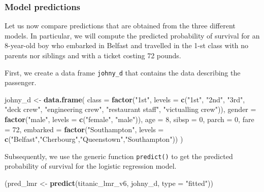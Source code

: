 \documentclass[12pt,]{krantz}
\newenvironment{Shaded}{\begin{snugshade}}{\end{snugshade}}
\newcommand{\DataTypeTok}[1]{\textcolor[rgb]{0.13,0.29,0.53}{#1}}
\newcommand{\DecValTok}[1]{\textcolor[rgb]{0.00,0.00,0.81}{#1}}
\newcommand{\KeywordTok}[1]{\textcolor[rgb]{0.13,0.29,0.53}{\textbf{#1}}}
\newcommand{\NormalTok}[1]{#1}
\newcommand{\StringTok}[1]{\textcolor[rgb]{0.31,0.60,0.02}{#1}}
\begin{document}
\hypertarget{predictions-titanic}{%
\subsubsection{Model predictions}\label{predictions-titanic}}

Let us now compare predictions that are obtained from the three different models. In particular, we will compute the predicted probability of survival for an 8-year-old boy who embarked in Belfast and travelled in the 1-st class with no parents nor siblings and with a ticket costing 72 pounds.

First, we create a data frame \texttt{johny\_d} that contains the data describing the passenger.

\begin{Shaded}
\begin{Highlighting}[]
\NormalTok{johny_d <-}\StringTok{ }\KeywordTok{data.frame}\NormalTok{(}
            \DataTypeTok{class =} \KeywordTok{factor}\NormalTok{(}\StringTok{"1st"}\NormalTok{, }\DataTypeTok{levels =} \KeywordTok{c}\NormalTok{(}\StringTok{"1st"}\NormalTok{, }\StringTok{"2nd"}\NormalTok{, }\StringTok{"3rd"}\NormalTok{, }\StringTok{"deck crew"}\NormalTok{, }\StringTok{"engineering crew"}\NormalTok{, }\StringTok{"restaurant staff"}\NormalTok{, }\StringTok{"victualling crew"}\NormalTok{)),}
            \DataTypeTok{gender =} \KeywordTok{factor}\NormalTok{(}\StringTok{"male"}\NormalTok{, }\DataTypeTok{levels =} \KeywordTok{c}\NormalTok{(}\StringTok{"female"}\NormalTok{, }\StringTok{"male"}\NormalTok{)),}
            \DataTypeTok{age =} \DecValTok{8}\NormalTok{,}
            \DataTypeTok{sibsp =} \DecValTok{0}\NormalTok{,}
            \DataTypeTok{parch =} \DecValTok{0}\NormalTok{,}
            \DataTypeTok{fare =} \DecValTok{72}\NormalTok{,}
            \DataTypeTok{embarked =} \KeywordTok{factor}\NormalTok{(}\StringTok{"Southampton"}\NormalTok{, }\DataTypeTok{levels =} \KeywordTok{c}\NormalTok{(}\StringTok{"Belfast"}\NormalTok{,}\StringTok{"Cherbourg"}\NormalTok{,}\StringTok{"Queenstown"}\NormalTok{,}\StringTok{"Southampton"}\NormalTok{))}
\NormalTok{)}
\end{Highlighting}
\end{Shaded}

Subsequently, we use the generic function \texttt{predict()} to get the predicted probability of survival for the logistic regression model.

\begin{Shaded}
\begin{Highlighting}[]
\NormalTok{(pred_lmr <-}\StringTok{ }\KeywordTok{predict}\NormalTok{(titanic_lmr_v6, johny_d, }\DataTypeTok{type =} \StringTok{"fitted"}\NormalTok{))}
\end{Highlighting}
\end{Shaded}
\end{document}
